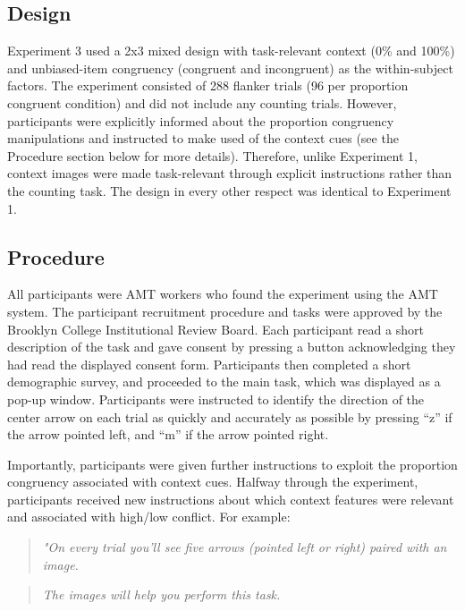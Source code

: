 \documentclass[english,,man,floatsintext]{apa6}
\begin{document}
\hypertarget{design-2}{%
\subsection{Design}\label{design-2}}

Experiment 3 used a 2x3 mixed design with task-relevant context (0\% and 100\%) and unbiased-item congruency (congruent and incongruent) as the within-subject factors. The experiment consisted of 288 flanker trials (96 per proportion congruent condition) and did not include any counting trials. However, participants were explicitly informed about the proportion congruency manipulations and instructed to make used of the context cues (see the Procedure section below for more details). Therefore, unlike Experiment 1, context images were made task-relevant through explicit instructions rather than the counting task. The design in every other respect was identical to Experiment 1.

\hypertarget{procedure-2}{%
\subsection{Procedure}\label{procedure-2}}

All participants were AMT workers who found the experiment using the AMT system. The participant recruitment procedure and tasks were approved by the Brooklyn College Institutional Review Board. Each participant read a short description of the task and gave consent by pressing a button acknowledging they had read the displayed consent form. Participants then completed a short demographic survey, and proceeded to the main task, which was displayed as a pop-up window. Participants were instructed to identify the direction of the center arrow on each trial as quickly and accurately as possible by pressing \enquote{z} if the arrow pointed left, and \enquote{m} if the arrow pointed right.

Importantly, participants were given further instructions to exploit the proportion congruency associated with context cues. Halfway through the experiment, participants received new instructions about which context features were relevant and associated with high/low conflict. For example:

\begin{quote}
\emph{"On every trial you'll see five arrows (pointed left or right) paired with an image.}
\end{quote}

\begin{quote}
\emph{The images will help you perform this task.}
\end{quote}
\end{document}
